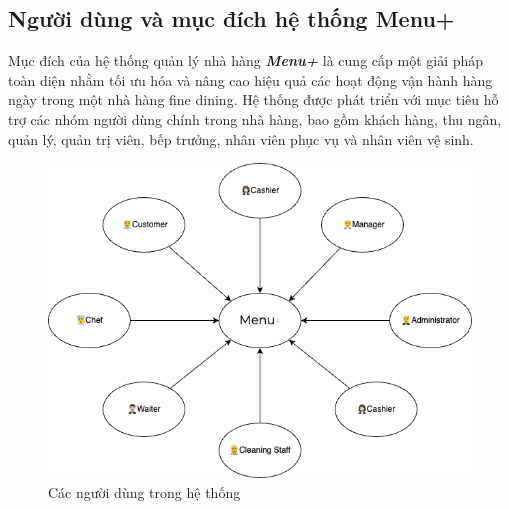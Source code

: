 \subsection{Người dùng và mục đích hệ thống Menu+}

Mục đích của hệ thống quản lý nhà hàng \textbf{\textit{Menu+}} là cung cấp một giải pháp toàn diện nhằm tối ưu hóa và nâng cao hiệu quả các hoạt động vận hành hàng ngày trong một nhà hàng fine dining. Hệ thống được phát triển với mục tiêu hỗ trợ các nhóm người dùng chính trong nhà hàng, bao gồm khách hàng, thu ngân, quản lý, quản trị viên, bếp trưởng, nhân viên phục vụ và nhân viên vệ sinh.

\begin{figure}[H]
	\centering
	\includegraphics[width=15cm]{Images/OMS-Page-2.png}
	\vspace{0.5cm}
	\caption{Các người dùng trong hệ thống}
	\label{fig:my_label}
\end{figure}

